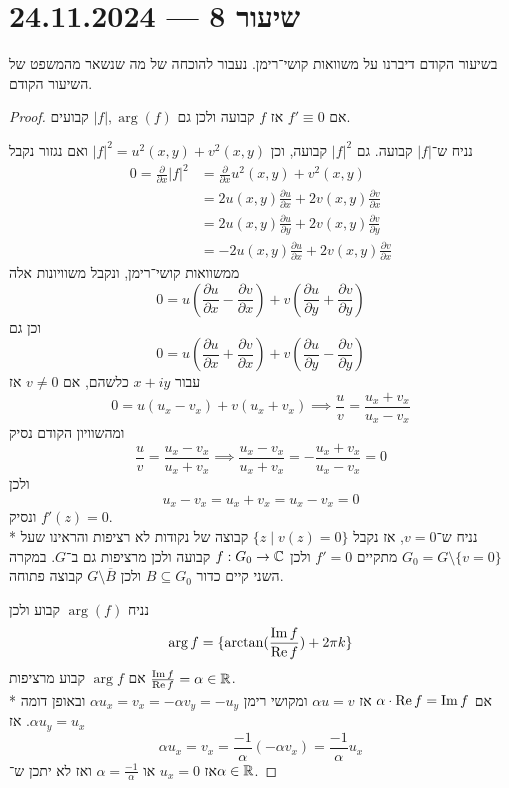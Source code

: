 \section{שיעור 8 --- 24.11.2024}
בשיעור הקודם דיברנו על משוואות קושי־רימן.
נעבור להוכחה של מה שנשאר מהמשפט של השיעור הקודם.
\begin{proof}
	אם $f' \equiv 0$ אז $f$ קבועה ולכן גם $|f|, \arg(f)$ קבועים.

	נניח ש־$|f|$ קבועה.
	גם ${|f|}^2$ קבועה, וכן ${|f|}^2 = u^2(x, y) + v^2(x, y)$ ואם נגזור נקבל
	\begin{align*}
		0 = \frac{\partial}{\partial x} {|f|}^2
		& = \frac{\partial}{\partial x} u^2(x, y) + v^2(x, y) \\
		& = 2u(x, y) \frac{\partial u}{\partial x} + 2v(x, y) \frac{\partial v}{\partial x} \\
		& = 2u(x, y) \frac{\partial u}{\partial y} + 2v(x, y) \frac{\partial v}{\partial y} \\
		& = -2u(x, y) \frac{\partial u}{\partial x} + 2v(x, y) \frac{\partial v}{\partial x}
	\end{align*}
	ממשוואות קושי־רימן, ונקבל משוויונות אלה
	\[
		0 = u (\frac{\partial u}{\partial x} - \frac{\partial v}{\partial x}) + v (\frac{\partial u}{\partial y} + \frac{\partial v}{\partial y})
	\]
	וכן גם
	\[
		0 = u (\frac{\partial u}{\partial x} + \frac{\partial v}{\partial x}) + v (\frac{\partial u}{\partial y} - \frac{\partial v}{\partial y})
	\]
	עבור $x + iy$ כלשהם, אם $v \ne 0$ אז
	\[
		0 = u(u_x - v_x) + v(u_x + v_x)
		\implies \frac{u}{v} = \frac{u_x + v_x}{u_x - v_x}
	\]
	ומהשוויון הקודם נסיק
	\[
		\frac{u}{v} = \frac{u_x - v_x}{u_x + v_x}
		\implies \frac{u_x - v_x}{u_x + v_x} = - \frac{u_x + v_x}{u_x - v_x} = 0
	\]
	ולכן
	\[
		u_x - v_x = u_x + v_x = u_x - v_x = 0
	\]
	ונסיק $f'(z) = 0$. \\*
	נניח ש־$v = 0$, אז נקבל  $\{z \mid v(z) = 0 \}$ קבוצה של נקודות לא רציפות והראינו שעל $G_0 = G \setminus \{v = 0\}$ מתקיים $f' = 0$ ולכן $f : G_0 \to \mathbb{C}$ קבועה ולכן מרציפות גם ב־$G$.
	במקרה השני קיים כדור $B \subseteq G_0$ ולכן $G \setminus \overline{B}$ קבוצה פתוחה.

	נניח $\arg(f)$ קבוע ולכן
	\[
		\arg f = \{ \arctan(\frac{\operatorname{Im} f}{\operatorname{Re} f}) + 2\pi k\}
	\]
	אם $\arg f$ קבוע מרציפות $\frac{\operatorname{Im} f}{\operatorname{Re} f} = \alpha \in \mathbb{R}$. \\*
	אם $\alpha \cdot \operatorname{Re} f = \operatorname{Im} f$ אז $\alpha u = v$ ומקושי רימן $\alpha u_x = v_x = - \alpha v_y = - u_y$ ובאופן דומה $\alpha u_y = u_x$.
	אז
	\[
		\alpha u_x = v_x = \frac{-1}{\alpha} (-\alpha v_x) = \frac{-1}{\alpha} u_x
	\]
	אז $u_x = 0$ או $\alpha = \frac{-1}{\alpha}$ ואז לא יתכן ש־$\alpha \in \mathbb{R}$.
\end{proof}

